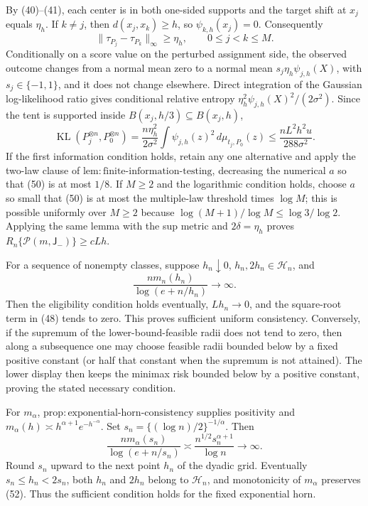 By (40)--(41), each center is in both one-sided supports and the target shift at \(x_j\) equals \(\eta_h\). If \(k\ne j\), then \(d(x_j,x_k)\ge h\), so \(\psi_{k,h}(x_j)=0\). Consequently
\[
 \|\tau_{P_j}-\tau_{P_k}\|_\infty\ge\eta_h,
 \qquad 0\le j<k\le M. \tag{49}
\]
Conditionally on a score value on the perturbed assignment side, the observed outcome changes from a normal mean zero to a normal mean \(s_j\eta_h\psi_{j,h}(X)\), with \(s_j\in\{-1,1\}\), and it does not change elsewhere. Direct integration of the Gaussian log-likelihood ratio gives conditional relative entropy \(\eta_h^2\psi_{j,h}(X)^2/(2\sigma^2)\). Since the tent is supported inside \(B(x_j,h/3)\subseteq B(x_j,h)\),
\[
 \operatorname{KL}(P_j^{\otimes n},P_0^{\otimes n})
 =\frac{n\eta_h^2}{2\sigma^2}\int\psi_{j,h}(z)^2\,d\mu_{t_j,P_0}(z)
 \le \frac{nL^2h^2u}{288\sigma^2}. \tag{50}
\]
If the first information condition holds, retain any one alternative and apply the two-law clause of \(\mathrm{lem:finite\text{-}information\text{-}testing}\), decreasing the numerical \(a\) so that (50) is at most \(1/8\). If \(M\ge2\) and the logarithmic condition holds, choose \(a\) so small that (50) is at most the multiple-law threshold times \(\log M\); this is possible uniformly over \(M\ge2\) because \(\log(M+1)/\log M\le\log3/\log2\). Applying the same lemma with the sup metric and \(2\delta=\eta_h\) proves \(R_n\{\mathcal P(m,\mathsf J_{-})\}\ge cLh\).

For a sequence of nonempty classes, suppose \(h_n\downarrow0\), \(h_n,2h_n\in\mathcal H_n\), and
\[
 \frac{nm_n(h_n)}{\log(e+n/h_n)}\longrightarrow\infty. \tag{51}
\]
Then the eligibility condition holds eventually, \(Lh_n\to0\), and the square-root term in (48) tends to zero. This proves sufficient uniform consistency. Conversely, if the supremum of the lower-bound-feasible radii does not tend to zero, then along a subsequence one may choose feasible radii bounded below by a fixed positive constant (or half that constant when the supremum is not attained). The lower display then keeps the minimax risk bounded below by a positive constant, proving the stated necessary condition.

For \(m_\alpha\), \(\mathrm{prop:exponential\text{-}horn\text{-}consistency}\) supplies positivity and
\(m_\alpha(h)\asymp h^{\alpha+1}e^{-h^{-\alpha}}\). Set \(s_n=\{(\log n)/2\}^{-1/\alpha}\). Then
\[
 \frac{nm_\alpha(s_n)}{\log(e+n/s_n)}
 \asymp
 \frac{n^{1/2}s_n^{\alpha+1}}{\log n}\longrightarrow\infty. \tag{52}
\]
Round \(s_n\) upward to the next point \(h_n\) of the dyadic grid. Eventually \(s_n\le h_n<2s_n\), both \(h_n\) and \(2h_n\) belong to \(\mathcal H_n\), and monotonicity of \(m_\alpha\) preserves (52). Thus the sufficient condition holds for the fixed exponential horn.

